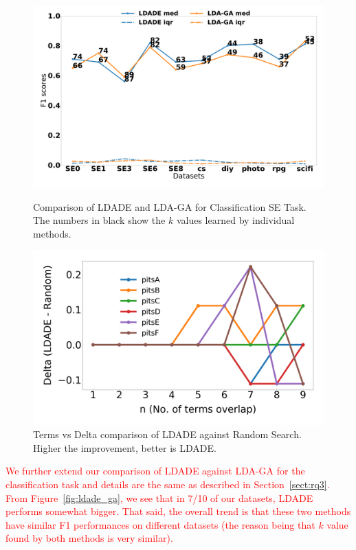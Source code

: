 \documentclass[twocolumn,5p,sort&compress]{elsarticle}
\theoremstyle{break}
\begin{document}
\begin{figure}[!t]
    \centering
  \begin{minipage}{.49\textwidth}
        \captionsetup{labelsep=space,justification=centering}
        \includegraphics[width=\linewidth]{./fig/F1_ga.png}
  \caption{Comparison of LDADE and LDA-GA for Classification SE Task. The numbers in black show the $k$ values
  learned by individual methods.}
  \label{fig:ldade_ga}
  \end{minipage}
  \begin{minipage}{.49\textwidth}
        \captionsetup{justification=centering}
        \includegraphics[width=\linewidth]{./fig/delta_randomness.png}
  \caption{Terms vs Delta comparison of LDADE against Random Search. Higher the improvement, better is LDADE.}
  \label{fig:random}
    \end{minipage}%
    
\end{figure}

\textcolor{red}{We further extend our comparison of LDADE against LDA-GA for the classification task and details are the same as described in Section~\ref{sect:rq3}.
 From Figure~\ref{fig:ldade_ga}, we   see  that in
 7/10 of our datasets, LDADE performs somewhat bigger.
 That said,
 the overall trend is that these two methods have similar F1 performances on different datasets
(the reason being that   $k$ value found by both methods is very similar).}
\end{document}
